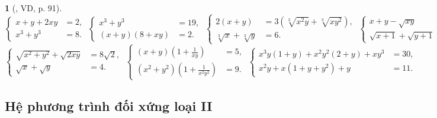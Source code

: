 \documentclass{article}
\newtheorem{baitoan}{}
\begin{document}
\begin{baitoan}[\cite{Kien_dai_so_9}, VD, p. 91]
	\begin{equation*}
		\left\{\begin{split}
			x + y + 2xy &= 2,\\
			x^3 + y^3 &= 8.
		\end{split}\right.\ \left\{\begin{split}
			x^3 + y^3 &= 19,\\
			(x + y)(8 + xy) &= 2.
		\end{split}\right.\ \left\{\begin{split}
			2(x + y) &= 3(\sqrt[3]{x^2y} + \sqrt[3]{xy^2}),\\
			\sqrt[3]{x} + \sqrt[3]{y} &= 6.
		\end{split}\right.\ \left\{\begin{split}
			x + y - \sqrt{xy} &= 3,\\
			\sqrt{x + 1} + \sqrt{y + 1} &= 4.
		\end{split}\right.
	\end{equation*}
	\begin{equation*}
		\left\{\begin{split}
			\sqrt{x^2 + y^2} + \sqrt{2xy} &= 8\sqrt{2},\\
			\sqrt{x} + \sqrt{y} &= 4.
		\end{split}\right.\ \left\{\begin{split}
			(x + y)\left(1 + \frac{1}{xy}\right) &= 5,\\
			(x^2 + y^2)\left(1 + \frac{1}{x^2y^2}\right) &= 9.
		\end{split}\right.\ \left\{\begin{split}
			x^3y(1 + y) + x^2y^2(2 + y) + xy^3 &= 30,\\
			x^2y + x(1 + y + y^2) + y &= 11.
		\end{split}\right.
	\end{equation*}	
\end{baitoan}

\subsection{Hệ phương trình đối xứng loại II}
\end{document}
